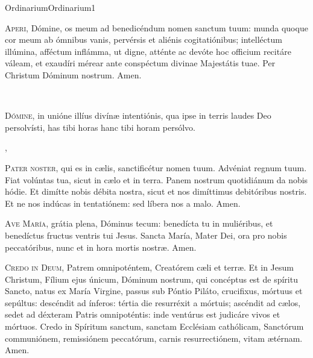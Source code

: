 \documentclass[psalterium-dominicis.tex]{subfiles}
\begin{document}
	{Ordinarium}{Ordinarium}{1}{}{}{}{}{}{}


\begin{multicols}{2}
\lettrine{A}{peri}, Dómine, os meum ad benedicéndum nomen sanctum tuum:
munda quoque cor meum ab ómnibus vanis, pervérsis et aliénis cogitatiónibus; 
intelléctum illúmina, afféctum inflámma, ut digne, atténte ac devóte
hoc officium recitáre váleam, et exaudíri mérear
ante conspéctum divinae Majestátis tuae. Per Christum Dóminum nostrum. Amen.

~

\lettrine{D}{ómine}, in unióne illíus divínæ intentiónis,
qua ipse in terris laudes Deo persolvísti,
has tibi horas  hanc tibi horam\rubric{)} persólvo.
\end{multicols}

\sep

\begin{multicols}{2}
\lettrine{P}{ater noster}, qui es in cælis, sanctificétur nomen tuum.
Advéniat regnum tuum. Fiat volúntas tua, sicut in cælo et in terra.
Panem nostrum quotidiánum da nobis hódie.
Et dimítte nobis débita nostra, sicut et nos dimíttimus debitóribus nostris.
Et ne nos indúcas in tentatiónem: sed líbera nos a malo. Amen.

\lettrine{A}{ve María}, grátia plena, Dóminus tecum:
benedícta tu in muliéribus, et benedíctus fructus ventris tui Jesus.
Sancta María, Mater Dei, ora pro nobis peccatóribus,
nunc et in hora mortis nostræ. Amen.

\lettrine{C}{redo in Deum}, Patrem omnipoténtem, Creatórem cæli et terræ.
Et in Jesum Christum, Fílium ejus únicum, Dóminum nostrum,
qui concéptus est de spíritu Sancto, natus ex María Virgine,
passus sub Póntio Piláto, crucifixus, mórtuus et sepúltus:
descéndit ad ínferos: tértia die resurréxit a mórtuis;
ascéndit ad cælos, sedet ad déxteram Patris omnipoténtis:
inde ventúrus est judicáre vivos et mórtuos.
Credo in Spíritum sanctum, sanctam Ecclésiam cathólicam,
Sanctórum communiónem, remissiónem peccatórum,
carnis resurrectiónem, vitam ætérnam. Amen.
\end{multicols}

\pagebreak


\end{document}
